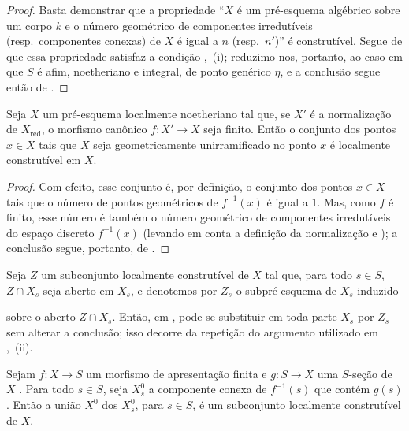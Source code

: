 \begin{proof}
Basta demonstrar que a propriedade ``$X$ é um pré-esquema algébrico sobre um corpo $k$ e o número geométrico de componentes irredutíveis (resp.\ componentes conexas) de $X$ é igual a $n$ (resp.\ $n'$)'' é construtível. Segue de  que essa propriedade satisfaz a condição ,~(i); reduzimo-nos, portanto, ao caso em que $S$ é afim, noetheriano e integral, de ponto genérico $\eta$, e a conclusão segue então de .
\end{proof}

\begin{corollary}[9.7.10]
\label{IV.9.7.10}
Seja $X$ um pré-esquema localmente noetheriano tal que, se $X'$ é a normalização de $X_{\mathrm{red}}$, o morfismo canônico $f:X'\to X$ seja finito. Então o conjunto dos pontos $x\in X$ tais que $X$ seja geometricamente unirramificado no ponto $x$ é localmente construtível em $X$.
\end{corollary}

\begin{proof}
Com efeito, esse conjunto é, por definição, o conjunto dos pontos $x\in X$ tais que o número de pontos geométricos de $f^{-1}(x)$ é igual a $1$. Mas, como $f$ é finito, esse número é também o número geométrico de componentes irredutíveis do espaço discreto $f^{-1}(x)$ (levando em conta a definição da normalização  e ); a conclusão segue, portanto, de .
\end{proof}

\begin{remark}[9.7.11]
\label{IV.9.7.11}
Seja $Z$ um subconjunto localmente construtível de $X$ tal que, para todo $s\in S$, $Z\cap X_s$ seja aberto em $X_s$, e denotemos por $Z_s$ o subpré-esquema de $X_s$ induzido


sobre o aberto $Z\cap X_s$. Então, em , pode-se substituir em toda parte $X_s$ por $Z_s$ sem alterar a conclusão; isso decorre da repetição do argumento utilizado em ,~(ii).
\end{remark}

\begin{proposition}[9.7.12]
\label{IV.9.7.12}
Sejam $f:X\to S$ um morfismo de apresentação finita e $g:S\to X$ uma $S$-seção de $X$ . Para todo $s\in S$, seja $X_s^0$ a componente conexa de $f^{-1}(s)$ que contém $g(s)$. Então a união $X^0$ dos $X_s^0$, para $s\in S$, é um subconjunto localmente construtível de $X$.
\end{proposition}

